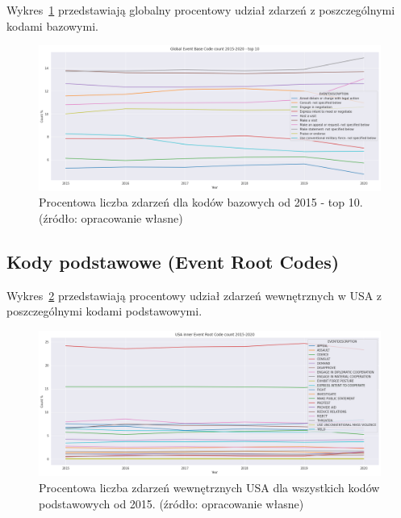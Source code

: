 \documentclass[11pt]{report}
\begin{document}
    Wykres~\ref{fig:GLOBAL_EBCperc} przedstawiają globalny procentowy udział zdarzeń z poszczególnymi kodami bazowymi.
    \begin{figure}[!htp]
        \centering
        \includegraphics[width=\linewidth]{fig/GLOBAL//EBCperc.png}
        \caption{Procentowa liczba zdarzeń dla kodów bazowych od 2015 - top 10. (źródło: opracowanie własne)}
        \label{fig:GLOBAL_EBCperc}
    \end{figure}

    \subsection{Kody podstawowe (Event Root Codes)}\label{subsec:kody-podstawowenullevent-root-codesnull2}

    Wykres~\ref{fig:USA_inner_ERCperc} przedstawiają procentowy udział zdarzeń wewnętrznych w USA z poszczególnymi kodami podstawowymi.
    \begin{figure}[!htp]
        \centering
        \includegraphics[width=\linewidth]{fig/USA inner/ERCperc.png}
        \caption{Procentowa liczba zdarzeń wewnętrznych USA dla wszystkich kodów podstawowych od 2015. (źródło: opracowanie własne)}
        \label{fig:USA_inner_ERCperc}
    \end{figure}
\end{document}
